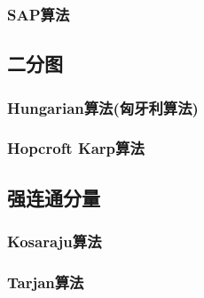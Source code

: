 \subsubsection{SAP算法}

\subsection{二分图}
\subsubsection{Hungarian算法(匈牙利算法)}
\subsubsection{Hopcroft Karp算法}

\subsection{强连通分量}
\subsubsection{Kosaraju算法}
\subsubsection{Tarjan算法}
